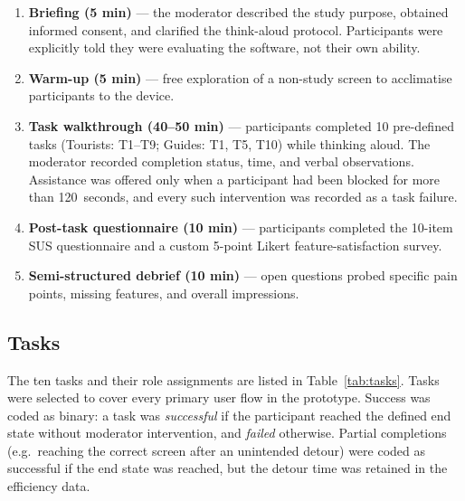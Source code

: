 \begin{enumerate}
  \item \textbf{Briefing (5 min)} — the moderator described the study purpose, obtained
        informed consent, and clarified the think-aloud protocol. Participants were
        explicitly told they were evaluating the software, not their own ability.
  \item \textbf{Warm-up (5 min)} — free exploration of a non-study screen to
        acclimatise participants to the device.
  \item \textbf{Task walkthrough (40--50 min)} — participants completed 10 pre-defined
        tasks (Tourists: T1--T9; Guides: T1, T5, T10) while thinking aloud. The
        moderator recorded completion status, time, and verbal observations. Assistance
        was offered only when a participant had been blocked for more than 120~seconds,
        and every such intervention was recorded as a task failure.
  \item \textbf{Post-task questionnaire (10 min)} — participants completed the
        10-item SUS questionnaire and a custom 5-point Likert feature-satisfaction
        survey.
  \item \textbf{Semi-structured debrief (10 min)} — open questions probed specific
        pain points, missing features, and overall impressions.
\end{enumerate}

\subsection{Tasks}
\label{sec:tasks}

The ten tasks and their role assignments are listed in Table~\ref{tab:tasks}. Tasks were
selected to cover every primary user flow in the prototype. Success was coded as binary:
a task was \textit{successful} if the participant reached the defined end state without
moderator intervention, and \textit{failed} otherwise. Partial completions (e.g.\
reaching the correct screen after an unintended detour) were coded as successful if the
end state was reached, but the detour time was retained in the efficiency data.

